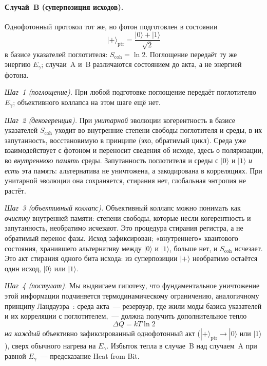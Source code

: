 \documentclass[11pt,a4paper]{article}
\begin{document}
\paragraph{Случай~B (суперпозиция исходов).}
Однофотонный протокол тот же, но фотон подготовлен в состоянии
\begin{equation}
|{+}\rangle_{\mathrm{ptr}} = \frac{|0\rangle + |1\rangle}{\sqrt{2}}
\end{equation}
в базисе указателей поглотителя: $S_{\mathrm{coh}}=\ln 2$. Поглощение передаёт ту же энергию $E_\gamma$; случаи~A и~B различаются состоянием до акта, а не энергией фотона.

\emph{Шаг~1 (поглощение).} При любой подготовке поглощение передаёт поглотителю $E_\gamma$; объективного коллапса на этом шаге ещё нет.

\emph{Шаг~2 (декогеренция).} При \emph{унитарной} эволюции когерентность в базисе указателей $S_{\mathrm{coh}}$ уходит во внутренние степени свободы поглотителя и среды, в их запутанность, восстановимую в принципе (эхо, обратимый цикл). Среда уже взаимодействует с фотоном и переносит сведения об исходе, здесь о поляризации, во \emph{внутреннюю память} среды. Запутанность поглотителя и среды с $|0\rangle$ и $|1\rangle$ \emph{и есть} эта память: альтернатива не уничтожена, а закодирована в корреляциях. При унитарной эволюции она сохраняется, стирания нет, глобальная энтропия не растёт.

\emph{Шаг~3 (объективный коллапс).} Объективный коллапс можно понимать как \emph{очистку} внутренней памяти: степени свободы, которые несли когерентность и запутанность, необратимо исчезают. Это процедура стирания регистра, а не обратимый перенос фазы. Исход зафиксирован; «внутреннего» квантового состояния, хранившего альтернативу между $|0\rangle$ и $|1\rangle$, больше нет, и $S_{\mathrm{coh}}$ исчезает. Это акт стирания одного бита исхода: из суперпозиции $|{+}\rangle$ необратимо остаётся один исход, $|0\rangle$ или $|1\rangle$.

\emph{Шаг~4 (постулат).} Мы выдвигаем гипотезу, что фундаментальное уничтожение этой информации подчиняется термодинамическому ограничению, аналогичному принципу Ландауэра~\cite{landauer1961}: среда акта~--- резервуар, где жили моды базиса указателей и их корреляции с поглотителем,~--- должна получить дополнительное тепло
\begin{equation}
\Delta Q = kT\ln 2
\end{equation}
\emph{на каждый} объективно зафиксированный однофотонный акт ($|{+}\rangle_{\mathrm{ptr}}\to|0\rangle$ или $|1\rangle$), сверх обычного нагрева на $E_\gamma$. Избыток тепла в случае~B над случаем~A при равной $E_\gamma$~--- предсказание Heat from Bit.
\end{document}
